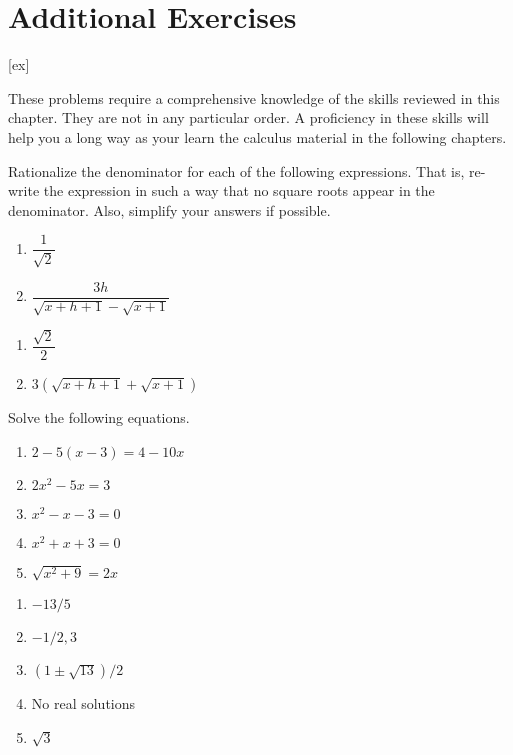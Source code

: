 \section{Additional Exercises}\label{sec:MoreReviewExercises}

[ex]

\begin{enumialphparenastyle}

These problems require a comprehensive knowledge of the skills reviewed in
this chapter. They are not in any particular order. A proficiency in these
skills will help you a long way as your learn the calculus material in the
following chapters.

\begin{ex}
Rationalize the denominator for each of the
following expressions. That is, re-write the expression in such a way that
no square roots appear in the denominator. Also, simplify your answers if
possible.
\begin{enumerate}
	\item	$\dfrac{1}{\sqrt{2}}$
	\item	$\dfrac{3h}{\sqrt{x+h+1}-\sqrt{x+1}}$
\end{enumerate}
\begin{sol}
\begin{enumerate}
	\item	$\dfrac{\sqrt{2}}{2}$
	\item	$3(\sqrt{x+h+1}+\sqrt{x+1})$
\end{enumerate}
\end{sol}
\end{ex}

\begin{ex}
Solve the following equations.
\begin{enumerate}
	\item	$2-5(x-3)=4-10x$
	\item	$2x^2-5x=3$
	\item	$x^2-x-3=0$
	\item	$x^2+x+3=0$
	\item	$\sqrt{x^2+9}=2x$
\end{enumerate}
\begin{sol}
\begin{enumerate}
	\item	$-13/5$
	\item	$-1/2,3$
	\item	$(1\pm\sqrt{13})/2$
	\item	No real solutions
	\item	$\sqrt{3}$
\end{enumerate}
\end{sol}
\end{ex}


\end{enumialphparenastyle}
